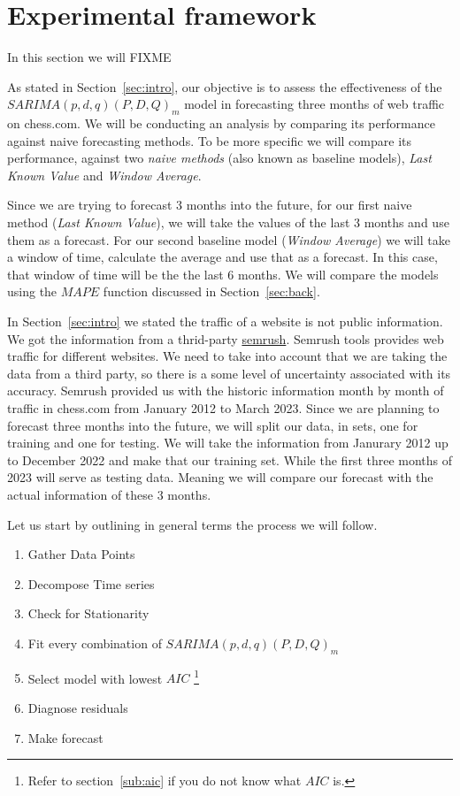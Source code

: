 \documentclass[journal]{IEEEtran}
\begin{document}
\section{Experimental framework}\label{sec:exp}

In this section we will FIXME

As stated in Section~\ref{sec:intro}, our objective is to assess the effectiveness of
the $SARIMA(p,d,q)(P,D,Q)_m$ model in forecasting three months of web traffic
on chess.com. We will be conducting an analysis by comparing its performance
against naive forecasting methods. To be more specific we will compare its
performance, against two \emph{naive methods} (also known as baseline models),
\emph{Last Known Value} and \emph{Window Average}.

Since we are trying to forecast 3 months into the future, for our first naive
method (\emph{Last Known Value}), we will take the values of the last 3 months
and use them as a forecast. For our second baseline model (\emph{Window
Average}) we will take a window of time, calculate the average and use that as
a forecast. In this case, that window of time will be the the last 6 months.
We will compare the models using the $MAPE$ function discussed in
Section~\ref{sec:back}.

In Section~\ref{sec:intro} we stated the traffic of a website is not public
information. We got the information from a thrid-party
\href{http://semrush.com}{semrush}. Semrush tools provides web traffic for
different websites. We need to take into account that we are taking the data
from a third party, so there is a some level of uncertainty associated with
its accuracy. Semrush provided us with the historic information month by month
of traffic in chess.com from January 2012 to March 2023. Since we are planning
to forecast three months into the future, we will split our data, in sets, one
for training and one for testing. We will take the information from Janurary
2012 up to December 2022 and make that our training set. While the first three
months of 2023 will serve as testing data. Meaning we will compare our
forecast with the actual information of these 3 months.

Let us start by outlining in general terms the process we will follow.

\begin{enumerate}
    \item Gather Data Points
    \item Decompose Time series
    \item Check for Stationarity
    \item Fit every combination of $SARIMA(p,d,q)(P,D,Q)_m$
    \item Select model with lowest $AIC$ \footnote{Refer to
        section~\ref{sub:aic} if you do not know what $AIC$ is.}
    \item Diagnose residuals
    \item Make forecast
\end{enumerate}
\end{document}

